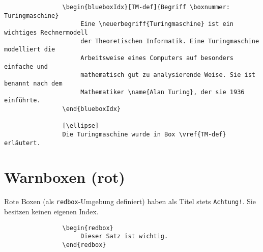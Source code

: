 			\begin{verbatim}
				\begin{blueboxIdx}[TM-def]{Begriff \boxnummer: Turingmaschine}
				     Eine \neuerbegriff{Turingmaschine} ist ein wichtiges Rechnermodell 
				     der Theoretischen Informatik. Eine Turingmaschine modelliert die 
				     Arbeitsweise eines Computers auf besonders einfache und 
				     mathematisch gut zu analysierende Weise. Sie ist benannt nach dem 
				     Mathematiker \name{Alan Turing}, der sie 1936 einführte.
				\end{blueboxIdx}
				
				[\ellipse]
				Die Turingmaschine wurde in Box \vref{TM-def} erläutert.
			\end{verbatim}
			 
		\newpage
		\section{Warnboxen (rot)}
			Rote Boxen (als \verb|redbox|-Umgebung definiert) haben als Titel stets \texttt{Achtung!}. Sie besitzen keinen eigenen Index.
			
			\begin{verbatim}
				\begin{redbox}
				     Dieser Satz ist wichtig.
				\end{redbox}
			\end{verbatim}
			
			
